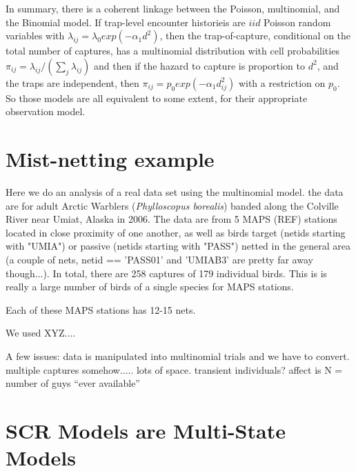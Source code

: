 In summary, there is a coherent linkage between the Poisson,
multinomial, and the Binomial model. If trap-level encounter
historieis are $iid$ Poisson random variables with $\lambda_{ij} =
\lambda_{0}exp(-\alpha_{1} d^{2})$, then the trap-of-capture,
conditional on the total number of captures, has a multinomial
distribution with cell probabilities $\pi_{ij} =
\lambda_{ij}/(\sum_{j} \lambda_{ij})$ and then if the hazard to
capture is proportion to $d^{2}$, and the traps are independent, then
$\pi_{ij} = p_{0} exp(-\alpha_{1} d_{ij}^{2})$ with a restriction on
$p_{0}$.  So those models are all
equivalent to some extent, for their appropriate observation model.



\section{Mist-netting example}

Here we do an analysis of a real data set using the multinomial model.
the data are for adult Arctic Warblers ({\it Phylloscopus borealis})
banded along the Colville River near Umiat, Alaska in 2006. The data
are from 5 MAPS (REF) stations located in close proximity of one
another, as well as birds target (netids starting with "UMIA") or
passive (netids starting with "PASS") netted in the general area (a
couple of nets, netid == 'PASS01' and 'UMIAB3' are pretty far away
though...). In total, there are 258 captures of 179 individual
birds. This is is really a large number of birds of a single species
for MAPS stations.
 
Each of these MAPS stations has 12-15 nets.

We used XYZ....
 
A few issues:
 data is manipulated into multinomial trials and we have to convert.
 multiple captures somehow.....
 lots of space.
 transient individuals?  affect is N = number of guys ``ever available''
 


\section{SCR Models are Multi-State Models}

